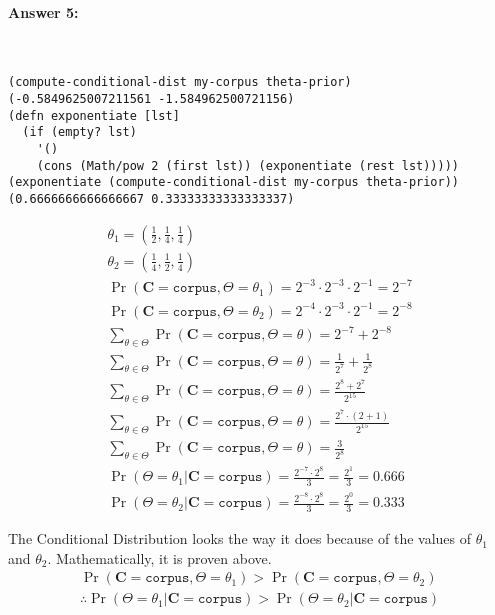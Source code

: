 \documentclass[12pt, letterpaper]{article}
\begin{document}
\paragraph{Answer 5:}~\begin{lstlisting}
(compute-conditional-dist my-corpus theta-prior)
(-0.5849625007211561 -1.584962500721156)
(defn exponentiate [lst]
  (if (empty? lst)
    '()
    (cons (Math/pow 2 (first lst)) (exponentiate (rest lst)))))
(exponentiate (compute-conditional-dist my-corpus theta-prior))
(0.6666666666666667 0.33333333333333337)
\end{lstlisting}
\begin{gather*}
    \theta_1 = \left(\frac{1}{2}, \frac{1}{4}, \frac{1}{4}\right)\\
    \theta_2 = \left(\frac{1}{4}, \frac{1}{2}, \frac{1}{4}\right)\\
    \Pr(\mathbf{C}=\texttt{corpus},\Theta=\theta_1) = 2^{-3}\cdot{2^{-3}\cdot{2^{-1}}} = 2^{-7}\\
    \Pr(\mathbf{C}=\texttt{corpus},\Theta=\theta_2) = 2^{-4}\cdot{2^{-3}\cdot{2^{-1}}} = 2^{-8}\\
    \sum_{\theta \in \Theta}\Pr(\mathbf{C}=\texttt{corpus}, \Theta=\theta) = 2^{-7} + 2^{-8}\\
    \sum_{\theta \in \Theta}\Pr(\mathbf{C}=\texttt{corpus}, \Theta=\theta) = \frac{1}{2^{7}} + \frac{1}{2^{8}}\\
    \sum_{\theta \in \Theta}\Pr(\mathbf{C}=\texttt{corpus}, \Theta=\theta) = \frac{2^{8}+ 2^{7}}{2^{15}}\\
    \sum_{\theta \in \Theta}\Pr(\mathbf{C}=\texttt{corpus}, \Theta=\theta) = \frac{2^{7}\cdot{(2+1)}}{2^{15}}\\
    \sum_{\theta \in \Theta}\Pr(\mathbf{C}=\texttt{corpus}, \Theta=\theta) = \frac{3}{2^{8}}\\
    \Pr(\Theta=\theta_1|\mathbf{C}=\texttt{corpus}) = \frac{2^{-7}\cdot{2^{8}}}{3} = \frac{2^{1}}{3}=0.666\\
    \Pr(\Theta=\theta_2|\mathbf{C}=\texttt{corpus}) = \frac{2^{-8}\cdot{2^{8}}}{3} = \frac{2^{0}}{3}=0.333
\end{gather*}

The Conditional Distribution looks the way it does because of the values of $\theta_1$ and $\theta_2$. Mathematically, it is proven above. 
\begin{gather*}
    \Pr(\mathbf{C}=\texttt{corpus},\Theta=\theta_1) > \Pr(\mathbf{C}=\texttt{corpus},\Theta=\theta_2)\\
    \therefore \Pr(\Theta=\theta_1|\mathbf{C}=\texttt{corpus}) > \Pr(\Theta=\theta_2|\mathbf{C}=\texttt{corpus})
\end{gather*}
\end{document}
